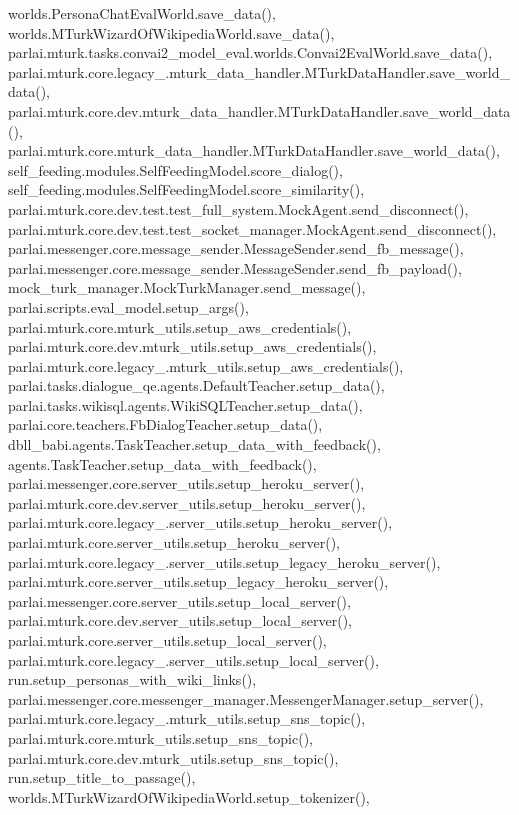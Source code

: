 worlds.\+Persona\+Chat\+Eval\+World.\+save\+\_\+data(), worlds.\+M\+Turk\+Wizard\+Of\+Wikipedia\+World.\+save\+\_\+data(), parlai.\+mturk.\+tasks.\+convai2\+\_\+model\+\_\+eval.\+worlds.\+Convai2\+Eval\+World.\+save\+\_\+data(), parlai.\+mturk.\+core.\+legacy\+\_.\+mturk\+\_\+data\+\_\+handler.\+M\+Turk\+Data\+Handler.\+save\+\_\+world\+\_\+data(), parlai.\+mturk.\+core.\+dev.\+mturk\+\_\+data\+\_\+handler.\+M\+Turk\+Data\+Handler.\+save\+\_\+world\+\_\+data(), parlai.\+mturk.\+core.\+mturk\+\_\+data\+\_\+handler.\+M\+Turk\+Data\+Handler.\+save\+\_\+world\+\_\+data(), self\+\_\+feeding.\+modules.\+Self\+Feeding\+Model.\+score\+\_\+dialog(), self\+\_\+feeding.\+modules.\+Self\+Feeding\+Model.\+score\+\_\+similarity(), parlai.\+mturk.\+core.\+dev.\+test.\+test\+\_\+full\+\_\+system.\+Mock\+Agent.\+send\+\_\+disconnect(), parlai.\+mturk.\+core.\+dev.\+test.\+test\+\_\+socket\+\_\+manager.\+Mock\+Agent.\+send\+\_\+disconnect(), parlai.\+messenger.\+core.\+message\+\_\+sender.\+Message\+Sender.\+send\+\_\+fb\+\_\+message(), parlai.\+messenger.\+core.\+message\+\_\+sender.\+Message\+Sender.\+send\+\_\+fb\+\_\+payload(), mock\+\_\+turk\+\_\+manager.\+Mock\+Turk\+Manager.\+send\+\_\+message(), parlai.\+scripts.\+eval\+\_\+model.\+setup\+\_\+args(), parlai.\+mturk.\+core.\+mturk\+\_\+utils.\+setup\+\_\+aws\+\_\+credentials(), parlai.\+mturk.\+core.\+dev.\+mturk\+\_\+utils.\+setup\+\_\+aws\+\_\+credentials(), parlai.\+mturk.\+core.\+legacy\+\_.\+mturk\+\_\+utils.\+setup\+\_\+aws\+\_\+credentials(), parlai.\+tasks.\+dialogue\+\_\+qe.\+agents.\+Default\+Teacher.\+setup\+\_\+data(), parlai.\+tasks.\+wikisql.\+agents.\+Wiki\+S\+Q\+L\+Teacher.\+setup\+\_\+data(), parlai.\+core.\+teachers.\+Fb\+Dialog\+Teacher.\+setup\+\_\+data(), dbll\+\_\+babi.\+agents.\+Task\+Teacher.\+setup\+\_\+data\+\_\+with\+\_\+feedback(), agents.\+Task\+Teacher.\+setup\+\_\+data\+\_\+with\+\_\+feedback(), parlai.\+messenger.\+core.\+server\+\_\+utils.\+setup\+\_\+heroku\+\_\+server(), parlai.\+mturk.\+core.\+dev.\+server\+\_\+utils.\+setup\+\_\+heroku\+\_\+server(), parlai.\+mturk.\+core.\+legacy\+\_.\+server\+\_\+utils.\+setup\+\_\+heroku\+\_\+server(), parlai.\+mturk.\+core.\+server\+\_\+utils.\+setup\+\_\+heroku\+\_\+server(), parlai.\+mturk.\+core.\+legacy\+\_.\+server\+\_\+utils.\+setup\+\_\+legacy\+\_\+heroku\+\_\+server(), parlai.\+mturk.\+core.\+server\+\_\+utils.\+setup\+\_\+legacy\+\_\+heroku\+\_\+server(), parlai.\+messenger.\+core.\+server\+\_\+utils.\+setup\+\_\+local\+\_\+server(), parlai.\+mturk.\+core.\+dev.\+server\+\_\+utils.\+setup\+\_\+local\+\_\+server(), parlai.\+mturk.\+core.\+server\+\_\+utils.\+setup\+\_\+local\+\_\+server(), parlai.\+mturk.\+core.\+legacy\+\_.\+server\+\_\+utils.\+setup\+\_\+local\+\_\+server(), run.\+setup\+\_\+personas\+\_\+with\+\_\+wiki\+\_\+links(), parlai.\+messenger.\+core.\+messenger\+\_\+manager.\+Messenger\+Manager.\+setup\+\_\+server(), parlai.\+mturk.\+core.\+legacy\+\_.\+mturk\+\_\+utils.\+setup\+\_\+sns\+\_\+topic(), parlai.\+mturk.\+core.\+mturk\+\_\+utils.\+setup\+\_\+sns\+\_\+topic(), parlai.\+mturk.\+core.\+dev.\+mturk\+\_\+utils.\+setup\+\_\+sns\+\_\+topic(), run.\+setup\+\_\+title\+\_\+to\+\_\+passage(), worlds.\+M\+Turk\+Wizard\+Of\+Wikipedia\+World.\+setup\+\_\+tokenizer(), 